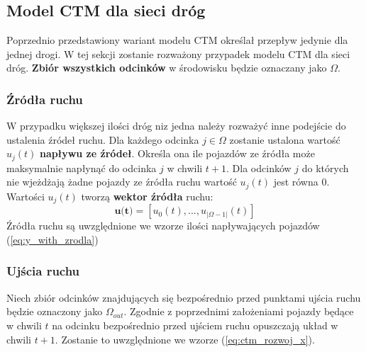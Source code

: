 \documentclass[12pt]{book}
\theoremstyle{plain}
\newcommand{\myref}[1]{(\ref{#1})}
\begin{document}
\subsection{Model CTM dla sieci dróg}
Poprzednio przedstawiony wariant modelu CTM określał przepływ jedynie dla jednej drogi. W tej sekcji zostanie rozważony przypadek modelu CTM dla sieci dróg. \textbf{Zbiór wszystkich odcinków} w środowisku będzie oznaczany jako $\Omega$. 
\subsubsection{Źródła ruchu}
W przypadku większej ilości dróg niz jedna należy rozważyć inne podejście do ustalenia źródeł ruchu. 
Dla każdego odcinka $j \in \Omega$ zostanie ustalona wartość $u_j(t)$ \textbf{napływu ze źródeł}. Określa ona ile pojazdów ze źródła może maksymalnie napłynąć do odcinka $j$ w chwili $t+1$. Dla odcinków $j$ do których nie wjeżdżają żadne pojazdy ze źródła ruchu wartość $u_j(t)$ jest równa 0. Wartości $u_j(t)$ tworzą \textbf{wektor źródła} ruchu:
\[\textbf{u(t)}=[u_0(t),...,u_{|\Omega-1|}(t)]\]
Źródła ruchu są uwzględnione we wzorze ilości napływających pojazdów \myref{eq:y_with_zrodla}
\subsubsection{Ujścia ruchu}
Niech zbiór odcinków znajdujących się bezpośrednio przed punktami ujścia ruchu będzie oznaczony jako $\Omega_{out}$.
Zgodnie z poprzednimi założeniami pojazdy będące w chwili $t$ na odcinku bezpośrednio przed ujściem ruchu opuszczają układ w chwili $t+1$. Zostanie to uwzględnione we wzorze \myref{eq:ctm_rozwoj_x}.
\end{document}
